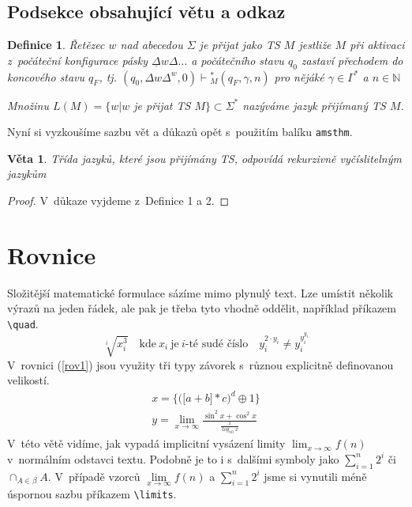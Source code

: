 \documentclass[11pt,a4paper,twocolumn]{article}
\newtheorem{definice}{Definice}
\newtheorem{sentence}{Věta}
  {\fontfamily{times}\selectfont}
\begin{document}
  \subsection{Podsekce obsahující větu a odkaz}
  \begin{definice}
  {\normalfont Řetězec $w$ nad abecedou $\Sigma$ je přijat jako TS $M$} jestliže $M$ při aktivaci z~počáteční konfigurace pásky $\underline{\Delta}w\Delta\dots$ a počátečního stavu $q_0$ zastaví přechodem do koncového stavu $q_F$, tj. $(q_0,\Delta w\Delta^w, 0){\vdash}{}_M^* (q_F,\gamma,n)$ pro nějáké $\gamma \in \Gamma^*$ a $n \in \mathbb{N}$

  Množinu $L(M) = \{ w | w$ je přijat TS $M \} \subset \Sigma^*$ nazýváme jazyk přijímaný TS $M$.
  \end{definice}

  Nyní si vyzkoušíme sazbu vět a důkazů opět s~použitím balíku \texttt{amsthm}.

  \begin{sentence}
  Třída jazyků, které jsou přijímány TS, odpovídá rekurzivně vyčíslitelným jazykům
  \end{sentence}

  \begin{proof}
  V~důkaze vyjdeme z~Definice 1 a 2.
  \end{proof}


  \section{Rovnice}
  Složitější matematické formulace sázíme mimo plynulý text. Lze umístit několik výrazů na jeden řádek, ale pak je třeba tyto vhodně oddělit, například příkazem \verb|\quad|.
  $$ \sqrt[i]{x^3_i} \quad \text{kde}\ x_i\ \text{je}\ i\text{-té sudé číslo} \quad y^{2 \cdot y_i}_i\neq y^{y^{y_i}_i}_i$$
  V~rovnici (\ref{rov1}) jsou využity tři typy závorek s~různou explicitně definovanou velikostí.
  \begin{eqnarray}
    \label{rov1} x = \bigg\{\Big(\big[a + b\big]*c\Big)^d \oplus 1\bigg\} \\
    \label{rov2} y = \lim_{x\to\infty} \frac{\sin^2x + \cos^2x}{\frac{1}{\log_{10} x}}
  \end{eqnarray}
  V~této větě vidíme, jak vypadá implicitní vysázení limity $\lim_{x\to\infty}f(n)$ v~normálním odstavci textu. Podobně je to i s~dalšími symboly jako $\sum^{n}_{i=1}2^i$ či $\cap_{A \in \beta}A$. V~případě vzorců $\lim\limits_{x\to\infty}f(n)$ a $\sum\limits^{n}_{i=1}2^i$ jsme si vynutili méně úspornou sazbu příkazem \verb|\limits|.
\end{document}
